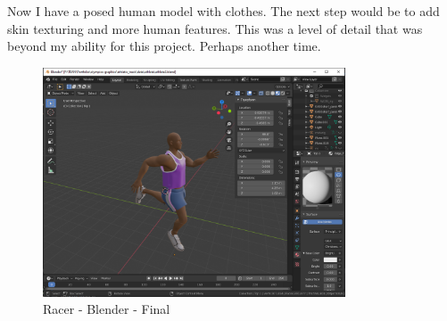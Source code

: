 \documentclass[a4 paper, 12pt]{article}
\begin{document}
Now I have a posed human model with clothes. The next step would be to add skin texturing and more human features. This was a level of detail that was beyond my ability for this project. Perhaps another time.
\begin{figure} [H]
    \centering
    \includegraphics[width=0.8\textwidth, frame]
        {./images/olympics/athlete_blend_clothes.PNG}  
    \caption{Racer - Blender - Final}   
\end{figure}
\end{document}
